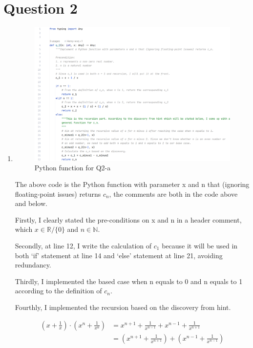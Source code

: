 \documentclass[12pt]{article}
\begin{document}
\section{Question 2}
\begin{enumerate}[label=(\alph*)]
    \item
\begin{figure}[h]
    \centering
    \includegraphics[width = 1.0\textwidth]{tex_pic/q2.png}
    \caption{Python function for Q2-a}
\end{figure}

\noindent The above code is the Python function with parameter x and n that (ignoring floating-point issues) returns $c_n$, the comments are both in the code above and below.

\noindent Firstly, I clearly stated the pre-conditions on x and n in a header comment, which $x \in \mathbb{R} / \{0\} $ and $n \in \mathbb{N}$.

\noindent Secondly, at line 12, I write the calculation of $c_1$ because it will be used in both `if' statement at line 14 and `else' statement at line 21, avoiding redundancy.

\noindent Thirdly, I implemented the based case when n equals to 0 and n equals to 1 according to the definition of $c_n$.

\noindent Fourthly, I implemented the recursion based on the discovery from hint.

\begin{align*}
    (x + \frac{1}{x}) \cdot (x^n + \frac{1}{x^n}) &= x^{n+1} + \frac{1}{x^{n-1}} + x^{n-1} + \frac{1}{x^{n+1}} \\
    &= (x^{n+1} + \frac{1}{x^{n+1}}) + (x^{n-1} + \frac{1}{x^{n-1}})
\end{align*}


\end{enumerate}
\end{document}
